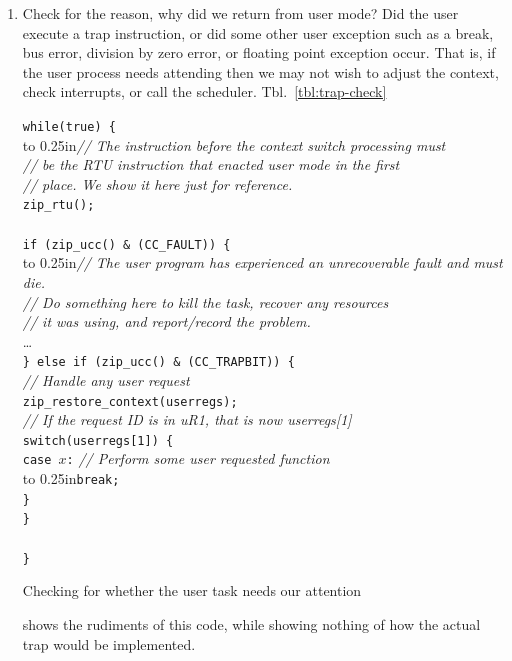 \documentclass{gqtekspec}
\begin{document}
\begin{enumerate}
\item Check for the reason, why did we return from user mode?  Did the user
	execute a trap instruction, or did some other user exception such as a
	break, bus error, division by zero error, or floating point exception
	occur.  That is, if the user process needs attending then we may not
	wish to adjust the context, check interrupts, or call the scheduler. 
	Tbl.~\ref{tbl:trap-check}
\begin{table}\begin{center}
\begin{tabbing}
{\tt while(true) \{} \\
	\hbox to 0.25in{}\={\em // The instruction before the context switch processing must} \\
\>	{\em // be the RTU instruction that enacted user mode in the first} \\
\>	{\em // place.  We show it here just for reference.} \\
\>	{\tt zip\_rtu();} \\
\\
\>	{\tt if (zip\_ucc() \& (CC\_FAULT)) \{} \\
\>	\hbox to 0.25in{}\={\em // The user program has experienced an unrecoverable fault and must die.}\\
\>\>	{\em // Do something here to kill the task, recover any resources} \\
\>\>		{\em // it was using, and report/record the problem.}\\
\>\>		\ldots \\
\>	{\tt \} else if (zip\_ucc() \& (CC\_TRAPBIT)) \{} \\
\>\>		{\em // Handle any user request} \\
\>\>		{\tt zip\_restore\_context(userregs);} \\
\>\>		{\em // If the request ID is in uR1, that is now userregs[1]}\\
\>\>		{\tt switch(userregs[1]) \{} \\
\>\>		{\tt case $x$:} {\em // Perform some user requested function} \\
\>\>		\hbox to 0.25in{}\= {\tt break;}\\
\>\>		{\tt \}} \\
\>	{\tt \}}\\
\\
{\tt \}}
\end{tabbing}
\caption{Checking for whether the user task needs our attention}\label{tbl:trap-check}
\end{center}\end{table}
	shows the rudiments of this code, while showing nothing of how the
	actual trap would be implemented.
	

\end{enumerate}
\end{document}
